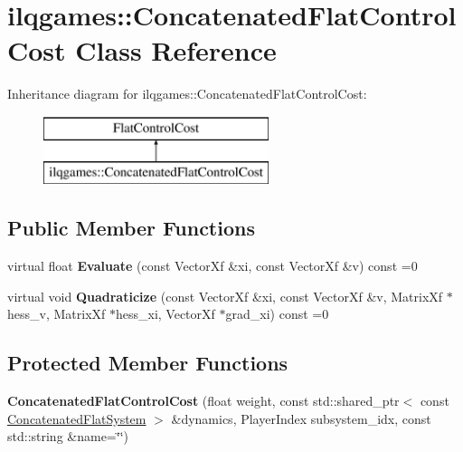 \hypertarget{classilqgames_1_1_concatenated_flat_control_cost}{}\section{ilqgames\+:\+:Concatenated\+Flat\+Control\+Cost Class Reference}
\label{classilqgames_1_1_concatenated_flat_control_cost}
Inheritance diagram for ilqgames\+:\+:Concatenated\+Flat\+Control\+Cost\+:\begin{figure}[H]
\begin{center}
\leavevmode
\includegraphics[height=2.000000cm]{classilqgames_1_1_concatenated_flat_control_cost}
\end{center}
\end{figure}
\subsection*{Public Member Functions}
\begin{DoxyCompactItemize}
\item 
virtual float {\bfseries Evaluate} (const Vector\+Xf \&xi, const Vector\+Xf \&v) const =0\hypertarget{classilqgames_1_1_concatenated_flat_control_cost_a3ae66836b63679b8cc749e69623dd797}{}\label{classilqgames_1_1_concatenated_flat_control_cost_a3ae66836b63679b8cc749e69623dd797}

\item 
virtual void {\bfseries Quadraticize} (const Vector\+Xf \&xi, const Vector\+Xf \&v, Matrix\+Xf $\ast$hess\+\_\+v, Matrix\+Xf $\ast$hess\+\_\+xi, Vector\+Xf $\ast$grad\+\_\+xi) const =0\hypertarget{classilqgames_1_1_concatenated_flat_control_cost_af74438ab5dc5c06352e2dbe7c9a77b1f}{}\label{classilqgames_1_1_concatenated_flat_control_cost_af74438ab5dc5c06352e2dbe7c9a77b1f}

\end{DoxyCompactItemize}
\subsection*{Protected Member Functions}
\begin{DoxyCompactItemize}
\item 
{\bfseries Concatenated\+Flat\+Control\+Cost} (float weight, const std\+::shared\+\_\+ptr$<$ const \hyperlink{classilqgames_1_1_concatenated_flat_system}{Concatenated\+Flat\+System} $>$ \&dynamics, Player\+Index subsystem\+\_\+idx, const std\+::string \&name=\char`\"{}\char`\"{})\hypertarget{classilqgames_1_1_concatenated_flat_control_cost_adced60cce1fb13c787a950357d188069}{}\label{classilqgames_1_1_concatenated_flat_control_cost_adced60cce1fb13c787a950357d188069}

\end{DoxyCompactItemize}
